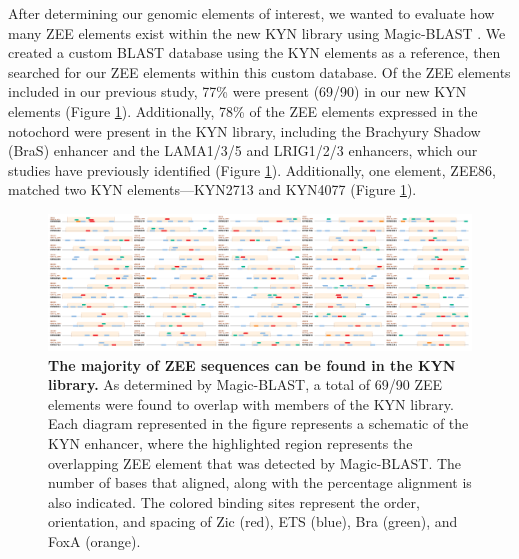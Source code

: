 After determining our genomic elements of interest, we wanted to evaluate how many ZEE elements exist within the new KYN library using Magic-BLAST \cite{boratyn2019}. We created a custom BLAST database using the KYN elements as a reference, then searched for our ZEE elements within this custom database. Of the ZEE elements included in our previous study, 77\% were present (69/90) in our new KYN elements (Figure \ref{fig:1 zee comparison}). Additionally, 78\% of the ZEE elements expressed in the notochord were present in the KYN library, including the Brachyury Shadow (BraS) enhancer and the LAMA1/3/5 and LRIG1/2/3 enhancers, which our studies have previously identified (Figure \ref{fig:1 zee comparison}). Additionally, one element, ZEE86, matched two KYN elements—KYN2713 and KYN4077 (Figure \ref{fig:1 zee comparison}). 

\begin{landscape}
    \begin{figure}[h]
        \centering
        \includegraphics[scale=0.12]{3_figures-and-files/Fig1_ZEE-Comparison.png}
        \caption[The majority of ZEE sequences can be found in the KYN library]{\textbf{The majority of ZEE sequences can be found in the KYN library.} 
        As determined by Magic-BLAST, a total of 69/90 ZEE elements were found to overlap with members of the KYN library. Each diagram represented in the figure represents a schematic of the KYN enhancer, where the highlighted region represents the overlapping ZEE element that was detected by Magic-BLAST. The number of bases that aligned, along with the percentage alignment is also indicated. The colored binding sites represent the order, orientation, and spacing of Zic (red), ETS (blue), Bra (green), and FoxA (orange).}
        \label{fig:1 zee comparison}
    \end{figure}
\end{landscape}

